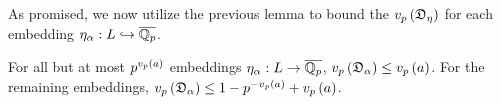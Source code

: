\documentclass[../main.tex]{subfiles}
\begin{document}
As promised, we now utilize the previous lemma to bound the $v_p\left( \mathfrak{D}_\eta \right)$ for each embedding $\eta_\alpha: L \hookrightarrow \overline{\mathbb{Q}_p}$.
\begin{lemma}
  \label{lem:different_valuation}
  For all but at most $p^{v_p\left( a \right)}$ embeddings $\eta_\alpha: L \to \overline{\mathbb{Q}_p}$, $v_p\left( \mathfrak{D}_\alpha \right) \leq v_p\left( a \right)$.
  For the remaining embeddings, $v_p\left( \mathfrak{D}_\alpha \right) \leq 1 - p^{-v_p\left( a \right)} + v_p\left( a \right)$.
  
\end{lemma}
\end{document}
